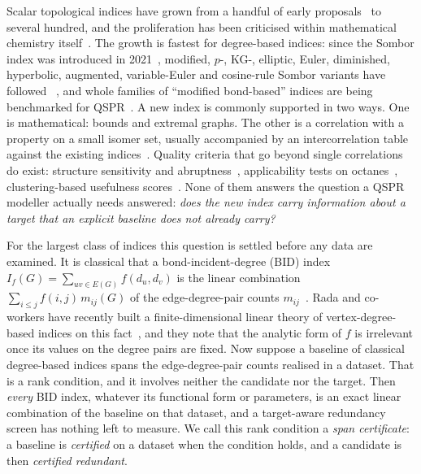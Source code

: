 \documentclass[11pt,a4paper]{article}
\theoremstyle{definition}
\begin{document}
Scalar topological indices have grown from a handful of early
proposals~\cite{Wiener1947,Gutman1972,Randic1975} to several hundred,
and the proliferation has been criticised within mathematical
chemistry itself~\cite{Gutman2013Degree}. The growth is fastest for
degree-based indices: since the Sombor index was introduced in
2021~\cite{Gutman2021Sombor}, modified, $p$-, KG-, elliptic, Euler,
diminished, hyperbolic, augmented, variable-Euler and cosine-rule Sombor
variants have followed
~\cite{KulliGutman2021Modified,GutmanFurtulaOz2024Elliptic,Gutman2024Euler,MovahediGutmanRedzepovicFurtula2026,BarmanDas2026Hyperbolic,RetiDoslicAli2021,KulliHarishChaluvarajuGutman2022KG,DasGutmanAli2026ASO,GutmanRedzepovicKizilirmakKulli2025Euler,NyauliBuragohain2026CoRSO},
and whole families of ``modified bond-based'' indices are being
benchmarked for QSPR~\cite{Altairi2026Modified,HayatAlanaziBelayWang2026}. A new index is commonly supported in two ways. One is
mathematical: bounds and extremal graphs. The other is a correlation
with a property on a small isomer set, usually accompanied by an
intercorrelation table against the existing
indices~\cite{Redzepovic2021ChemSombor,MovahediGutmanRedzepovicFurtula2026}.
Quality criteria that go beyond single correlations do exist:
structure sensitivity and abruptness~\cite{FurtulaGutmanDehmer2013},
applicability tests on octanes~\cite{KumarDas2024Structure},
clustering-based usefulness
scores~\cite{DehmerEmmertStreibTripathi2013,Ma2022Usefulness}. None
of them answers the question a QSPR modeller actually needs answered:
\emph{does the new index carry information about a target that an
explicit baseline does not already carry?}

For the largest class of indices this question is settled before any
data are examined. It is classical that a bond-incident-degree (BID)
index $I_f(G)=\sum_{uv\in E(G)} f(d_u,d_v)$ is the linear combination
$\sum_{i\le j} f(i,j)\,m_{ij}(G)$ of the edge-degree-pair counts
$m_{ij}$~\cite{Gutman2013Degree,RadaCruz2014VDB}. Rada and co-workers
have recently built a finite-dimensional linear theory of
vertex-degree-based indices on this
fact~\cite{CruzEspinalRada2024Matrix,Rada2026LinearVDB}, and they note
that the analytic form of $f$ is irrelevant once its values on the
degree pairs are fixed. Now suppose a baseline of classical
degree-based indices spans the edge-degree-pair counts realised in a
dataset. That is a rank condition, and it involves neither the
candidate nor the target. Then \emph{every} BID index, whatever its
functional form or parameters, is an exact linear combination of the
baseline on that dataset, and a target-aware redundancy screen has
nothing left to measure. We call this rank condition a \emph{span
certificate}: a baseline is \emph{certified} on a dataset when the
condition holds, and a candidate is then \emph{certified redundant}.
\end{document}
